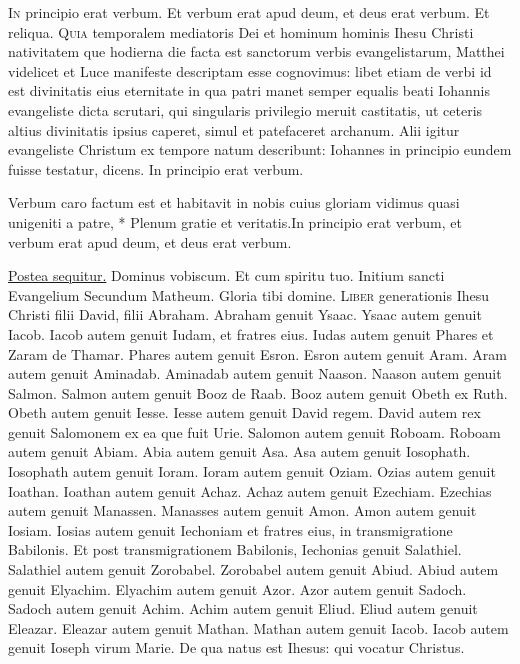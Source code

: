 \begin{multicols*}{2}
\begin{responsory}
\end{responsory}
\lettrine[lines=2]{\zallmancaps \color{Blue} I}{n} principio erat verbum. Et verbum erat apud deum, et deus erat verbum. Et reliqua.
\lettrine[lines=2]{\zallmancaps \color{Red} Q}{uia} temporalem mediatoris Dei et hominum hominis Ihesu Christi nativitatem que hodierna die facta est sanctorum verbis evangelistarum, Matthei videlicet et Luce manifeste descriptam esse cognovimus: libet etiam de verbi id est divinitatis eius eternitate in qua patri manet semper equalis beati Iohannis evangeliste dicta scrutari, qui singularis privilegio meruit castitatis, ut ceteris altius divinitatis ipsius caperet, simul et patefaceret archanum. Alii igitur evangeliste Christum ex tempore natum describunt: Iohannes in principio eundem fuisse testatur, dicens. In principio erat verbum.
\begin{responsory-doxology}
{Verbum caro factum est et habitavit in nobis cuius gloriam vidimus quasi unigeniti a patre, * Plenum gratie et veritatis.}{In principio erat verbum, et verbum erat apud deum, et deus erat verbum.}
\end{responsory-doxology}
\newline \ul{Postea sequitur.} Dominus vobiscum. Et cum spiritu tuo.
\newline Initium sancti Evangelium Secundum Matheum. Gloria tibi domine.
\lettrine[lines=2]{\zallmancaps \color{Blue} L}{iber} generationis Ihesu Christi filii David, filii Abraham. Abraham genuit Ysaac. Ysaac autem genuit Iacob. Iacob autem genuit Iudam, et fratres eius. Iudas autem genuit Phares et Zaram de Thamar. Phares autem genuit Esron. Esron autem genuit Aram. Aram autem genuit Aminadab. Aminadab autem genuit Naason. Naason autem genuit Salmon. Salmon autem genuit Booz de Raab. Booz autem genuit Obeth ex Ruth. Obeth autem genuit Iesse. Iesse autem genuit David regem. David autem rex genuit Salomonem ex ea que fuit Urie. Salomon autem genuit Roboam. Roboam autem genuit Abiam. Abia autem genuit Asa. Asa autem genuit Iosophath. Iosophath autem genuit Ioram. Ioram autem genuit Oziam. Ozias autem genuit Ioathan. Ioathan autem genuit Achaz. Achaz autem genuit Ezechiam. Ezechias autem genuit Manassen. Manasses autem genuit Amon. Amon autem genuit Iosiam. Iosias autem genuit Iechoniam et fratres eius, in transmigratione Babilonis. Et post transmigrationem Babilonis, Iechonias genuit Salathiel. Salathiel autem genuit Zorobabel. Zorobabel autem genuit Abiud. Abiud autem genuit Elyachim. Elyachim autem genuit Azor. Azor autem genuit Sadoch. Sadoch autem genuit Achim. Achim autem genuit Eliud. Eliud autem genuit Eleazar. Eleazar autem genuit Mathan. Mathan autem genuit Iacob. Iacob autem genuit Ioseph virum Marie. De qua natus est Ihesus: qui vocatur Christus.

\end{multicols*}
